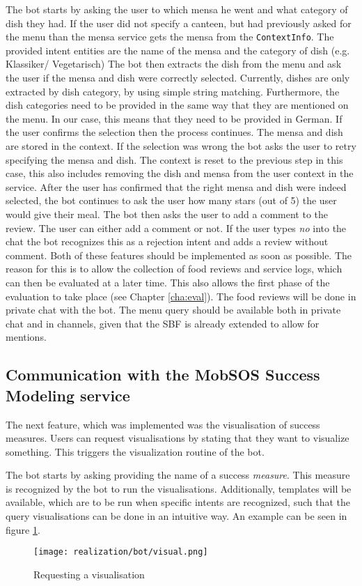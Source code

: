 The bot starts by asking the user to which mensa he went and what category of dish they had. If the user did not specify a canteen, but had previously asked for the menu than the mensa service gets the mensa from the \texttt{ContextInfo}. 
The provided intent entities are the name of the mensa and the category of dish (e.g. Klassiker/ Vegetarisch) 
The bot then extracts the dish from the menu and ask the user if the mensa and dish were correctly selected. Currently, dishes are only extracted by dish category, by using simple string matching. Furthermore, the dish categories need to be provided in the same way that they are mentioned on the menu. In our case, this means that they need to be provided in German.
If the user confirms the selection then the process continues. The mensa and dish are stored in the context. If the selection was wrong the bot asks the user to retry specifying the mensa and dish. The context is reset to the previous step in this case, this also includes removing the dish and mensa from the user context in the service.
After the user has confirmed that the right mensa and dish were indeed selected, the bot continues to ask the user how many stars (out of 5) the user would give their meal. 
The bot then asks the user to add a comment to the review. The user can either add a comment or not. If the user types \emph{no} into the chat the bot recognizes this as a rejection intent and adds a review without comment.
Both of these features should be implemented as soon as possible. The reason for this is to allow the collection of food reviews and service logs, which can then be evaluated at a later time.
This also allows the first phase of the evaluation to take place (see Chapter \ref{cha:eval}).
The food reviews will be done in private chat with the bot. The menu query should be available both in private chat and in channels, given that the SBF is already extended to allow for mentions.

\subsection{Communication with the MobSOS Success Modeling service}

The next feature, which was implemented was the visualisation of success measures. Users can request visualisations by stating that they want to visualize something.
This triggers the visualization routine of the bot.

The bot starts by asking providing the name of a success \emph{measure}.
This measure is recognized by the bot to run the visualisations. Additionally, templates will be available, which are to be run when specific intents are recognized, such that the query visualisations can be done in an intuitive way. An example can be seen in figure \ref{fig:visualReq}.
\begin{figure}[h]
    \centering
    \texttt{[image: realization/bot/visual.png]}
    \caption{Requesting a visualisation}
    \label{fig:visualReq}
\end{figure}

